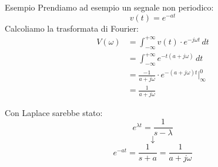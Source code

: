 \documentclass[a4paper]{article}
\begin{document}
\begin{examplebox}{Esempio}
  Prendiamo ad esempio un segnale non periodico:
  \[
    v(t) = e^{-at}
  \] 
  Calcoliamo la trasformata di Fourier:
  \[
    \begin{aligned}
      V(\omega) &= \int_{-\infty}^{+\infty} v(t) \cdot e^{-j \omega t} \, dt\\
                &= \int_{-\infty}^{+\infty} e^{-t (a+j \omega)} \, dt\\
                &= \frac{-1}{a + j \omega} \cdot e^{-(a+j \omega)t} \Big|_{\infty}^{0}\\
                &= \frac{1}{a + j \omega}
    \end{aligned}
  \] 

  \vspace{1em}
  \noindent
  Con Laplace sarebbe stato:
  \[
    e^{\lambda t} = \frac{1}{s - \lambda}
  \] 
  \[
  \downarrow
  \] 
  \[
    e^{-at} = \frac{1}{s + a} = \frac{1}{a + j \omega}
  \] 
\end{examplebox}
\end{document}

